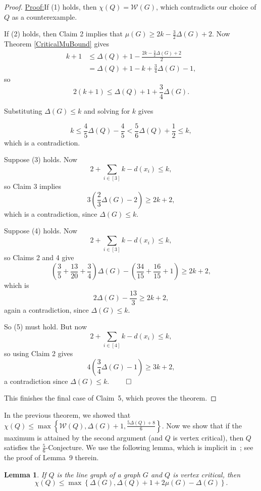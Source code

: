 \documentclass[12pt]{article}
\theoremstyle{plain}
\newtheorem{lem}[thm]{Lemma}
\theoremstyle{definition}
\theoremstyle{remark}
\newcommand{\fancy}[1]{\mathcal{#1}}
\newcommand{\W}{\fancy{W}}
\newcommand{\set}[1]{\left\{ #1 \right\}}
\newcommand{\irange}[1]{\left[#1\right]}
\newcommand{\parens}[1]{\left( #1 \right)}
\newenvironment{claimproof}[1]{\par\noindent\underline{Proof:}\space#1}{\leavevmode\unskip\penalty9999
\hbox{}\nobreak\hfill\quad\hbox{$\qed$}}
\begin{document}
\begin{proof}
\begin{claimproof}
If (1) holds, then $\chi(Q) = \W(G)$, which contradicts our choice of
$Q$ as a counterexample.

If (2) holds, then Claim 2 implies that $\mu(G) \ge 2k - \frac32\Delta(G) + 2$. 
Now Theorem \ref{CriticalMuBound} gives
\begin{align*}
k + 1 &\le \Delta(Q)+1-\frac{2k-\frac32\Delta(G)+2}2\\
&=\Delta(Q) + 1 - k +
\frac34\Delta(G) - 1,
\end{align*}
so
\[2(k + 1) \le \Delta(Q) + 1 + \frac34\Delta(G).\]

Substituting $\Delta(G) \le k$ and solving for $k$ gives

\[k  \le \frac45\Delta(Q) - \frac45 < \frac56\Delta(Q)+\frac12 \le k,\]
which is a contradiction.

Suppose (3) holds.  
Now \[2 + \sum_{i \in \irange{3}} k - d(x_i) \le k,\]
so Claim 3 implies
\[3\parens{\frac23\Delta(G) -2} \ge 2k+2,\]
which is a contradiction, since $\Delta(G) \le k$.

Suppose (4) holds.  Now
\[2 + \sum_{i \in \irange{3}} k - d(x_i) \le k,\]
so Claims 2 and 4 give
\[ \parens{\frac35 + \frac{13}{20} + \frac34}\Delta(G)-\parens{\frac{34}{15} + \frac{16}{15} + 1}\ge 2k+2,\]
which is
\[2\Delta(G) -\frac{13}3\ge 2k+2,\]
again a contradiction, since $\Delta(G) \le k$.


So (5) must hold.  But now
\[2 + \sum_{i \in \irange{4}} k - d(x_i) \le k,\]
so using Claim 2 gives
\[4\parens{\frac34\Delta(G) - 1} \ge 3k+2,\]
a contradiction since $\Delta(G) \le k$.
\end{claimproof}

This finishes the final case of Claim~5, which proves the theorem.
\end{proof}

In the previous theorem, we showed that 
$\chi(Q) \le \max\set{\W(Q), \Delta(G) + 1, \frac{5\Delta(Q) +
8}{6}}$.  Now we show that if the maximum is attained by the second argument
(and $Q$ is vertex critical), then $Q$ satisfies the $\frac56$-Conjecture.
We use the following lemma, which is implicit in~\cite{rabern2011strengthening};
see the proof of Lemma~9 therein.

\begin{lem}\label{CriticalMuBoundOtherWay}
If $Q$ is the line graph of a graph $G$ and $Q$ is vertex critical, then
\[\chi(Q) \leq \max\left\{\Delta(G), \Delta(Q) + 1 + 2\mu(G) - \Delta(G)\right\}.\]
\end{lem}
\end{document}
